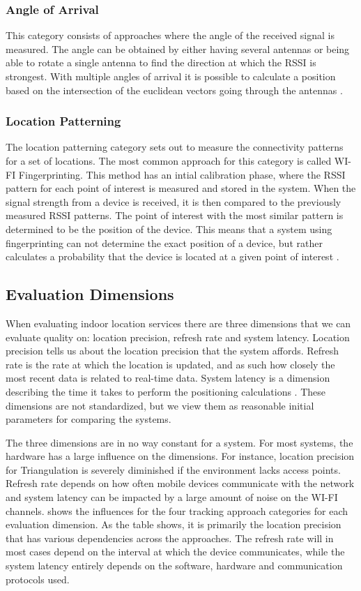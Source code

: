 \subsubsection*{Angle of Arrival}
This category consists of approaches where the angle of the received signal is measured. The angle can be obtained by either having several antennas or being able to rotate a single antenna to find the direction at which the RSSI is strongest. With multiple angles of arrival it is possible to calculate a position based on the intersection of the euclidean vectors going through the antennas \cite{tracking_approaches}. 

\subsubsection*{Location Patterning}
The location patterning category sets out to measure the connectivity patterns for a set of locations. The most common approach for this category is called WI-FI Fingerprinting. This method has an intial calibration phase, where the RSSI pattern for each point of interest is measured and stored in the system. When the signal strength from a device is received, it is then compared to the previously measured RSSI patterns. The point of interest with the most similar pattern is determined to be the position of the device. This means that a system using fingerprinting can not determine the exact position of a device, but rather calculates a probability that the device is located at a given point of interest \cite{fingerprint1}.

\subsection{Evaluation Dimensions}
When evaluating indoor location services there are three dimensions that we can evaluate quality on: location precision, refresh rate and system latency. Location precision tells us about the location precision that the system affords. Refresh rate is the rate at which the location is updated, and as such how closely the most recent data is related to real-time data. System latency is a dimension describing the time it takes to perform the positioning calculations \cite{dimensions}. These dimensions are not standardized, but we view them as reasonable initial parameters for comparing the systems.

The three dimensions are in no way constant for a system. For most systems, the hardware has a large influence on the dimensions. For instance, location precision for Triangulation is severely diminished if the environment lacks access points. Refresh rate depends on how often mobile devices communicate with the network and system latency can be impacted by a large amount of noise on the WI-FI channels.  shows the influences for the four tracking approach categories for each evaluation dimension. As the table shows, it is primarily the location precision that has various dependencies across the approaches. The refresh rate will in most cases depend on the interval at which the device communicates, while the system latency entirely depends on the software, hardware and communication protocols used.

